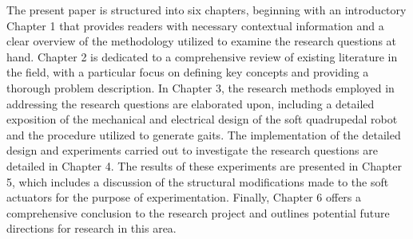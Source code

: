 The present paper is structured into six chapters, beginning with an introductory Chapter 1 that provides readers with necessary contextual information and a clear overview of the methodology utilized to examine the research questions at hand. Chapter 2 is dedicated to a comprehensive review of existing literature in the field, with a particular focus on defining key concepts and providing a thorough problem description. In Chapter 3, the research methods employed in addressing the research questions are elaborated upon, including a detailed exposition of the mechanical and electrical design of the soft quadrupedal robot and the procedure utilized to generate gaits. The implementation of the detailed design and experiments carried out to investigate the research questions are detailed in Chapter 4. The results of these experiments are presented in Chapter 5, which includes a discussion of the structural modifications made to the soft actuators for the purpose of experimentation. Finally, Chapter 6 offers a comprehensive conclusion to the research project and outlines potential future directions for research in this area.